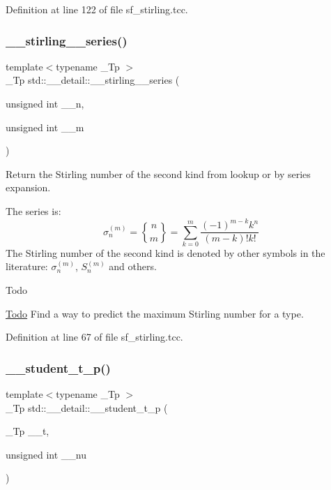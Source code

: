 Definition at line 122 of file sf\+\_\+stirling.\+tcc.

\mbox{\label{namespacestd_1_1____detail_a8408f17699eb43a14447c7e4795b277f}} 
\subsubsection{\texorpdfstring{\+\_\+\+\_\+stirling\+\_\+\_\+series()}{\_\_stirling\_2\_series()}}
{\footnotesize\ttfamily template$<$typename \+\_\+\+Tp $>$ \\
\+\_\+\+Tp std\+::\+\_\+\+\_\+detail\+::\+\_\+\+\_\+stirling\+\_\+\_\+series (\begin{DoxyParamCaption}\item[{unsigned int}]{\+\_\+\+\_\+n,  }\item[{unsigned int}]{\+\_\+\+\_\+m }\end{DoxyParamCaption})}

Return the Stirling number of the second kind from lookup or by series expansion.

The series is\+: \[ \newcommand{\stirling}[2]{\genfrac{\{}{\}}{0pt}{0}{#1}{#2}} \sigma_n^{(m)} = \stirling{n}{m} = \sum_{k=0}^{m}\frac{(-1)^{m-k}k^n}{(m-k)!k!} \] The Stirling number of the second kind is denoted by other symbols in the literature\+: $ \sigma_n^{(m)} $, $ \textit{S}_n^{(m)} $ and others.

\begin{DoxyRefDesc}{Todo}
\item[\hyperlink{todo__todo000015}{Todo}]Find a way to predict the maximum Stirling number for a type. \end{DoxyRefDesc}


Definition at line 67 of file sf\+\_\+stirling.\+tcc.

\mbox{\label{namespacestd_1_1____detail_ab9bb02e26c61e3d9dda4738ed4174338}} 
\subsubsection{\texorpdfstring{\+\_\+\+\_\+student\+\_\+t\+\_\+p()}{\_\_student\_t\_p()}}
{\footnotesize\ttfamily template$<$typename \+\_\+\+Tp $>$ \\
\+\_\+\+Tp std\+::\+\_\+\+\_\+detail\+::\+\_\+\+\_\+student\+\_\+t\+\_\+p (\begin{DoxyParamCaption}\item[{\+\_\+\+Tp}]{\+\_\+\+\_\+t,  }\item[{unsigned int}]{\+\_\+\+\_\+nu }\end{DoxyParamCaption})}



